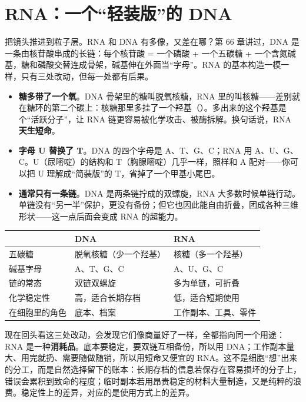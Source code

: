 \section{RNA：一个“轻装版”的 DNA}

把镜头推进到粒子层。RNA 和 DNA 有多像，又差在哪？第 66 章讲过，DNA 是一条由核苷酸串成的长链：每个核苷酸 = 一个磷酸 + 一个五碳糖 + 一个含氮碱基，糖和磷酸交替连成骨架，碱基伸在外面当“字母”。RNA 的基本构造一模一样，只有三处改动，但每一处都有后果。

\begin{itemize}[itemsep=2pt]
\item \textbf{糖多带了一个氧}。DNA 骨架里的糖叫脱氧核糖，RNA 里的叫核糖——差别就在糖环的第二个碳上：核糖那里多挂了一个羟基（）。多出来的这个羟基是个“活跃分子”，让 RNA 链更容易被化学攻击、被酶拆解。换句话说，RNA \textbf{天生短命}。
\item \textbf{字母 U 替换了 T}。DNA 的四个字母是 A、T、G、C；RNA 用 A、U、G、C。U（尿嘧啶）的结构和 T（胸腺嘧啶）几乎一样，照样和 A 配对——你可以把 U 理解成“简装版”的 T，省掉了一个甲基小尾巴。
\item \textbf{通常只有一条链}。DNA 是两条链拧成的双螺旋，RNA 大多数时候单链行动。单链没有“另一半”保护，更没有备份；但它也因此能自由折叠，团成各种三维形状——这一点后面会变成 RNA 的超能力。
\end{itemize}

\begin{table}[htbp]
\centering
\begin{tabular}{lll}
\toprule
 & DNA & RNA \\
\midrule
五碳糖 & 脱氧核糖（少一个羟基） & 核糖（多一个羟基） \\
碱基字母 & A、T、G、C & A、U、G、C \\
链的常态 & 双链双螺旋 & 多为单链，可折叠 \\
化学稳定性 & 高，适合长期存档 & 低，适合短期使用 \\
在细胞里的角色 & 底本、档案 & 工作副本、工具、零件 \\
\bottomrule
\end{tabular}
\end{table}

现在回头看这三处改动，会发现它们像商量好了一样，全都指向同一个用途：RNA 是一种\textbf{消耗品}。底本要稳定，要双链互相备份，所以用 DNA；工作副本量大、用完就扔、需要随做随销，所以用短命又便宜的 RNA。这不是细胞“想”出来的分工，而是自然选择留下的账本：长期存档的信息若保存在容易损坏的分子上，错误会累积到致命的程度；临时副本若用昂贵稳定的材料大量制造，又是纯粹的浪费。稳定性上的差异，对应的是使用方式上的差异。

